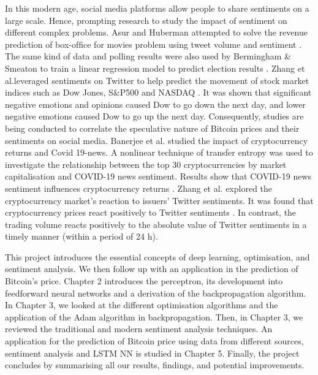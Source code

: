 \par In this modern age, social media platforms allow people to share sentiments on a large scale. Hence, prompting research to study the impact of sentiment on different complex problems. Asur and Huberman attempted to solve the revenue prediction of box-ofﬁce for movies problem using tweet volume and sentiment \cite{Asur2010}. The same kind of data and polling results were also used by Bermingham \& Smeaton to train a linear regression model to predict election results \cite{smeaton2011}. Zhang et al.leveraged sentiments on Twitter to help predict the movement of stock market indices such as Dow Jones, S\&P500 and NASDAQ \cite{Zhang2011}. It was shown that significant negative emotions and opinions caused Dow to go down the next day, and lower negative emotions caused Dow to go up the next day. Consequently, studies are being conducted to correlate the speculative nature of Bitcoin prices and their sentiments on social media. Banerjee et al. studied the impact of cryptocurrency returns and Covid 19-news. A nonlinear technique of transfer entropy was used to investigate the relationship between the top 30 cryptocurrencies by market capitalisation and COVID-19 news sentiment. Results show that COVID-19 news sentiment influences cryptocurrency returns \cite{Banerjee2022}. Zhang et al. explored the cryptocurrency market's reaction to issuers' Twitter sentiments. It was found that cryptocurrency prices react positively to Twitter sentiments \cite{Zhang2022}. In contrast, the trading volume reacts positively to the absolute value of Twitter sentiments in a timely manner (within a period of 24 h).

\par This project introduces the essential concepts of deep learning, optimisation, and sentiment analysis. We then follow up with an application in the prediction of Bitcoin's price. Chapter 2 introduces the perceptron, its development into feedforward neural networks and a derivation of the backpropagation algorithm. In Chapter 3, we looked at the different optimisation algorithms and the application of the Adam algorithm in backpropagation. Then, in Chapter 3, we reviewed the traditional and modern sentiment analysis techniques. An application for the prediction of Bitcoin price using data from different sources, sentiment analysis and LSTM NN is studied in Chapter 5. Finally, the project concludes by summarising all our results, findings, and potential improvements.









